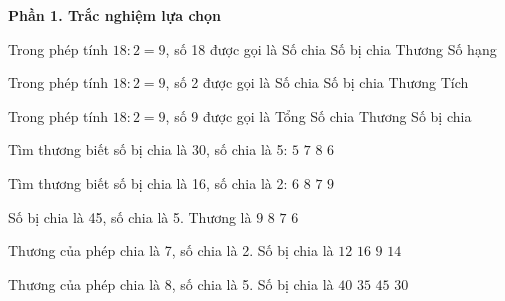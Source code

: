 \textbf{Phần 1. Trắc nghiệm lựa chọn}

\begin{ex} %
Trong phép tính $18 : 2 = 9$, số 18 được gọi là
\choice
{Số chia}
{\True Số bị chia}
{Thương}
{Số hạng}
\end{ex}

\begin{ex} %
Trong phép tính $18 : 2 = 9$, số 2 được gọi là
\choice
{\True Số chia}
{Số bị chia}
{Thương}
{Tích}
\end{ex}

\begin{ex} %
Trong phép tính $18 : 2 = 9$, số 9 được gọi là
\choice
{Tổng}
{Số chia}
{\True Thương}
{Số bị chia}
\end{ex}

\begin{ex} %
Tìm thương biết số bị chia là 30, số chia là 5:
\choice
{$5$}
{$7$}
{$8$}
{\True $6$}
\end{ex}

\begin{ex} %
Tìm thương biết số bị chia là 16, số chia là 2:
\choice
{$6$}
{\True $8$}
{$7$}
{$9$}
\end{ex}

\begin{ex} %
Số bị chia là 45, số chia là 5. Thương là
\choice
{\True $9$}
{$8$}
{$7$}
{$6$}
\end{ex}

\begin{ex} %
Thương của phép chia là 7, số chia là 2. Số bị chia là
\choice
{$12$}
{$16$}
{$9$}
{\True $14$}
\end{ex}

\begin{ex} %
Thương của phép chia là 8, số chia là 5. Số bị chia là
\choice
{\True $40$}
{$35$}
{$45$}
{$30$}
\end{ex}

